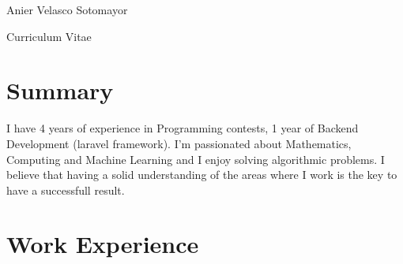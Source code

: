 \documentclass[
	10pt, %
]{FreemanCV}
\begin{document}
\begin{paracol}{2} %


\parbox[][0.11\textheight][c]{\linewidth}{ %
	\centering %
	
	{\sffamily\Huge Anier Velasco Sotomayor} %
	
	\medskip %
	
	{\Huge\textcolor{headings}{Curriculum Vitae}}
	
	\vfill %
}

\section*{Summary}

I have 4 years of experience in Programming contests, 1 year of Backend Development (laravel framework).
I'm passionated about Mathematics, Computing and Machine Learning and I enjoy solving algorithmic problems.
I believe that having a solid understanding of the areas where I work is the key to have a successfull result.





\section{Work Experience}




\end{paracol}
\end{document}
